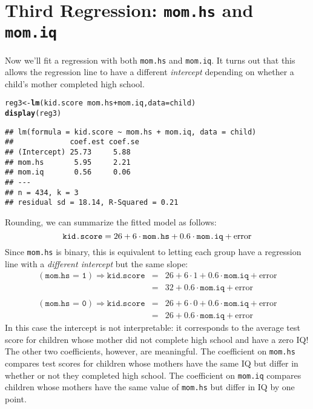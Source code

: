 \documentclass[12pt]{article}\usepackage[]{graphicx}\usepackage[]{color}
\makeatletter
\newcommand{\hlopt}[1]{\textcolor[rgb]{0,0,0}{#1}}%
\newcommand{\hlstd}[1]{\textcolor[rgb]{0.345,0.345,0.345}{#1}}%
\newcommand{\hlkwb}[1]{\textcolor[rgb]{0.69,0.353,0.396}{#1}}%
\newcommand{\hlkwc}[1]{\textcolor[rgb]{0.333,0.667,0.333}{#1}}%
\newcommand{\hlkwd}[1]{\textcolor[rgb]{0.737,0.353,0.396}{\textbf{#1}}}%
\newenvironment{kframe}{%
 \def\at@end@of@kframe{}%
 \ifinner\ifhmode%
  \def\at@end@of@kframe{\end{minipage}}%
  \begin{minipage}{\columnwidth}%
 \fi\fi%
 \def\FrameCommand##1{\hskip\@totalleftmargin \hskip-\fboxsep
 \colorbox{shadecolor}{##1}\hskip-\fboxsep
     \hskip-\linewidth \hskip-\@totalleftmargin \hskip\columnwidth}%
 \MakeFramed {\advance\hsize-\width
   \@totalleftmargin\z@ \linewidth\hsize
   \@setminipage}}%
 {\par\unskip\endMakeFramed%
 \at@end@of@kframe}
\newenvironment{knitrout}{}{} %
\makeatother
\begin{document}
\section*{Third Regression: \texttt{mom.hs} and \texttt{mom.iq}}
Now we'll fit a regression with both \texttt{mom.hs} and \texttt{mom.iq}.
It turns out that this allows the regression line to have a different \emph{intercept} depending on whether a child's mother completed high school.
\begin{knitrout}
\color{fgcolor}\begin{kframe}
\begin{alltt}
\hlstd{reg3} \hlkwb{<-} \hlkwd{lm}\hlstd{(kid.score} \hlopt{~} \hlstd{mom.hs} \hlopt{+} \hlstd{mom.iq,} \hlkwc{data} \hlstd{= child)}
\hlkwd{display}\hlstd{(reg3)}
\end{alltt}
\begin{verbatim}
## lm(formula = kid.score ~ mom.hs + mom.iq, data = child)
##             coef.est coef.se
## (Intercept) 25.73     5.88  
## mom.hs       5.95     2.21  
## mom.iq       0.56     0.06  
## ---
## n = 434, k = 3
## residual sd = 18.14, R-Squared = 0.21
\end{verbatim}
\end{kframe}
\end{knitrout}
Rounding, we can summarize the fitted model as follows:
  $$\mbox{\texttt{kid.score}} = 26 + 6 \cdot \mbox{\texttt{mom.hs}} +0.6 \cdot \mbox{\texttt{mom.iq}} + \mbox{error} $$
  Since \texttt{mom.hs} is binary, this is equivalent to letting each group have a regression line with a \emph{different intercept} but the same slope:
  \begin{eqnarray*}
    (\texttt{mom.hs = 1})\Rightarrow \texttt{kid.score} &=& 26 + 6 \cdot 1 + 0.6\cdot \texttt{mom.iq} + \mbox{error}\\
      &=& 32 + 0.6\cdot \texttt{mom.iq} + \mbox{error}\\ \\
    (\texttt{mom.hs = 0})\Rightarrow \texttt{kid.score} &=& 26 + 6 \cdot 0 + 0.6\cdot \texttt{mom.iq} + \mbox{error}\\
      &=&26 + 0.6\cdot \texttt{mom.iq} + \mbox{error}
  \end{eqnarray*}
In this case the intercept is not interpretable: it corresponds to the average test score for children whose mother did not complete high school and have a zero IQ! The other two coefficients, however, are meaningful. The coefficient on \texttt{mom.hs} compares test scores for children whose mothers have the same IQ but differ in whether or not they completed high school. The coefficient on \texttt{mom.iq} compares children whose mothers have the same value of \texttt{mom.hs} but differ in IQ by one point. 
\end{document}
